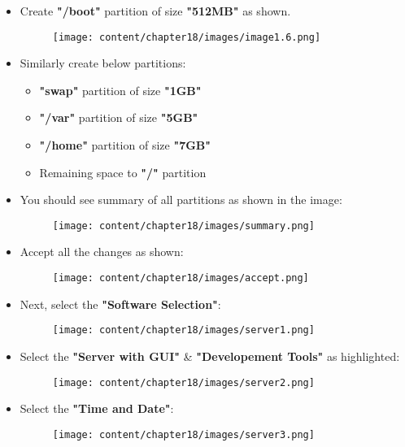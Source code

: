 \begin{flushleft}
\begin{itemize}
 	\item Create \textbf{"/boot"} partition of size \textbf{"512MB"} as shown.
	\begin{figure}[h!]
		\centering
		\texttt{[image: content/chapter18/images/image1.6.png]}
	\end{figure}		

 	\item Similarly create below partitions:
 	\begin{itemize}
 		\item \textbf{"swap"} partition of size \textbf{"1GB"}
 		\item \textbf{"/var"} partition of size \textbf{"5GB"}
 		\item \textbf{"/home"} partition of size \textbf{"7GB"}
 		\item Remaining space to \textbf{"/"} partition
 	\end{itemize}

	\item You should see summary of all partitions as shown in the image:
	\begin{figure}[h!]
		\centering
		\texttt{[image: content/chapter18/images/summary.png]}
		\label{primary_swap1}
	\end{figure}		


 	\item Accept all the changes as shown:
	\begin{figure}[h!]
		\centering
		\texttt{[image: content/chapter18/images/accept.png]}
	\end{figure}		

	\newpage
	\item Next, select the \textbf{"Software Selection"}:
	\begin{figure}[h!]
		\centering
		\texttt{[image: content/chapter18/images/server1.png]}
	\end{figure}		
	
	\item Select the \textbf{"Server with GUI"} \& \textbf{"Developement Tools"} as highlighted:
	\begin{figure}[h!]
		\centering
		\texttt{[image: content/chapter18/images/server2.png]}
		\caption{}
		\label{primary_swap3}
	\end{figure}		
	\newpage
	\item Select the \textbf{"Time and Date"}:
	\begin{figure}[h!]
		\centering
		\texttt{[image: content/chapter18/images/server3.png]}
	\end{figure}		


\end{itemize}
\end{flushleft}
